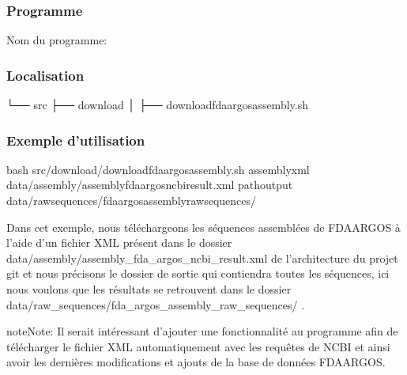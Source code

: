 \documentclass[letterpaper,10pt,french]{sphinxmanual}
\begin{document}
\subsubsection{Programme}
\label{\detokenize{tutorial:id1}}
Nom du programme:

\begin{sphinxVerbatim}[commandchars=\\\{\}]
\end{sphinxVerbatim}


\subsubsection{Localisation}
\label{\detokenize{tutorial:id2}}
\begin{sphinxVerbatim}[commandchars=\\\{\}]
└── src
 ├── download
 │   ├── download\PYGZus{}fda\PYGZus{}argos\PYGZus{}assembly.sh
\end{sphinxVerbatim}


\subsubsection{Exemple d’utilisation}
\label{\detokenize{tutorial:id3}}
\begin{sphinxVerbatim}[commandchars=\\\{\}]
bash src/download/download\PYGZus{}fda\PYGZus{}argos\PYGZus{}assembly.sh 
                 \PYGZhy{}assembly\PYGZus{}xml data/assembly/assembly\PYGZus{}fda\PYGZus{}argos\PYGZus{}ncbi\PYGZus{}result.xml 
                 \PYGZhy{}path\PYGZus{}output data/raw\PYGZus{}sequences/fda\PYGZus{}argos\PYGZus{}assembly\PYGZus{}raw\PYGZus{}sequences/
\end{sphinxVerbatim}

Dans cet exemple, nous téléchargeons les séquences assemblées de FDA\sphinxhyphen{}ARGOS à l’aide d’un fichier XML présent dans le dossier data/assembly/assembly\_fda\_argos\_ncbi\_result.xml de l’architecture du projet git et nous précisons le dossier de sortie qui contiendra toutes les séquences, ici nous voulons que les résultats se retrouvent dans le dossier data/raw\_sequences/fda\_argos\_assembly\_raw\_sequences/ .

\begin{sphinxadmonition}{note}{Note:}
Il serait intéressant d’ajouter une fonctionnalité au programme afin de télécharger le fichier XML automatiquement avec les requêtes de NCBI et ainsi avoir les dernières modifications et ajouts de la base de données FDA\sphinxhyphen{}ARGOS.
\end{sphinxadmonition}
\end{document}
